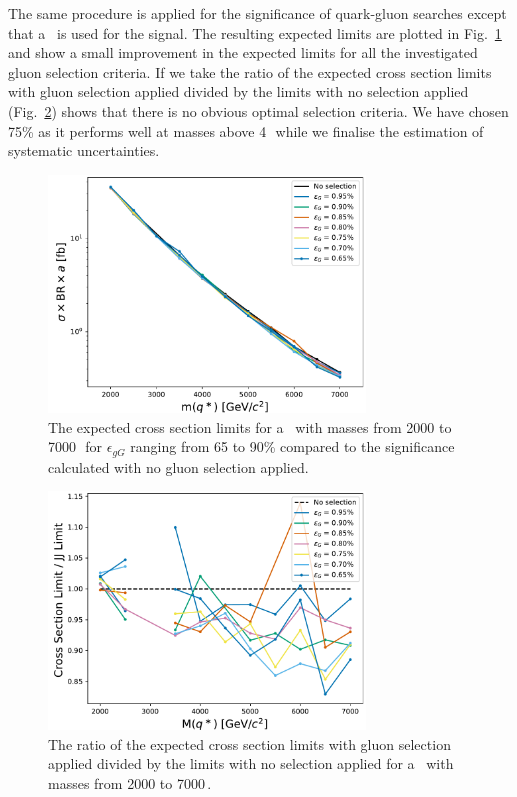The same procedure is applied for the significance of quark-gluon searches except that a \qstar\ is used for the signal. 
The resulting expected limits are plotted in Fig.~\ref{fig:QuarkGluonSignalSignificancePD}  and show a small 
improvement in the expected limits for all the investigated gluon selection criteria. If we take the 
ratio of the expected cross section limits with gluon selection applied divided by the limits with no 
selection applied (Fig.~\ref{fig:QuarkGluonSignalSignificanceRatio}) shows that there is no obvious optimal
selection criteria. We have chosen 75\% as it performs well at masses above 4\,\TeV\ while we finalise 
the estimation of systematic uncertainties. 



\begin{figure}[htb]
 \centering
\includegraphics[width=0.75\textwidth]{figures/significance/Limits_QG_All.pdf}
\caption{ The expected cross section limits for a \qstar\ with masses from 2000 to 7000\,\GeV\ 
for $\epsilon_{gG}$ ranging from 65 to 90\% compared to the significance calculated with 
   no gluon selection applied.
  \label{fig:QuarkGluonSignalSignificancePD}}
\end{figure}

\begin{figure}[htb]
 \centering
\includegraphics[width=0.75\textwidth]{figures/significance/Ratio_QG_All.pdf}
\caption{ The ratio of the expected cross section limits with gluon selection applied divided by the limits with no selection applied for a \qstar\ with masses from 2000 to 7000\,\GeV. \label{fig:QuarkGluonSignalSignificanceRatio}}
\end{figure}


